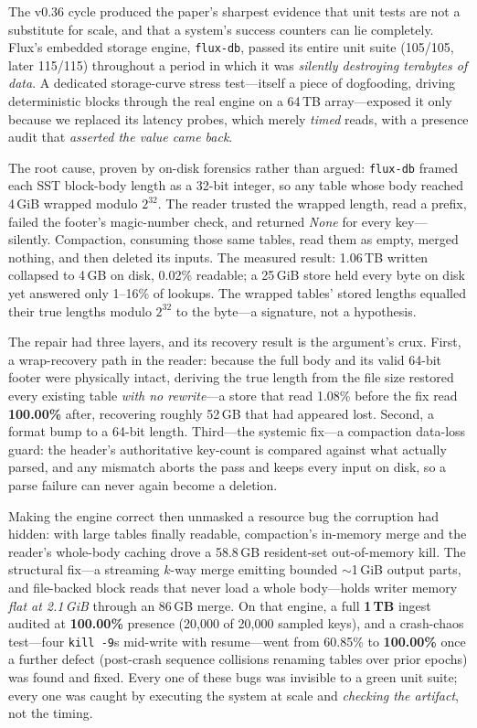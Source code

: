 The v0.36 cycle produced the paper's sharpest evidence that unit tests are not a substitute for scale, and that a system's success counters can lie completely. Flux's embedded storage engine, \texttt{flux-db}, passed its entire unit suite (105/105, later 115/115) throughout a period in which it was \emph{silently destroying terabytes of data}. A dedicated storage-curve stress test---itself a piece of dogfooding, driving deterministic blocks through the real engine on a 64\,TB array---exposed it only because we replaced its latency probes, which merely \emph{timed} reads, with a presence audit that \emph{asserted the value came back}.

The root cause, proven by on-disk forensics rather than argued: \texttt{flux-db} framed each SST block-body length as a 32-bit integer, so any table whose body reached 4\,GiB wrapped modulo $2^{32}$. The reader trusted the wrapped length, read a prefix, failed the footer's magic-number check, and returned \emph{None} for every key---silently. Compaction, consuming those same tables, read them as empty, merged nothing, and then deleted its inputs. The measured result: 1.06\,TB written collapsed to 4\,GB on disk, 0.02\% readable; a 25\,GiB store held every byte on disk yet answered only 1--16\% of lookups. The wrapped tables' stored lengths equalled their true lengths modulo $2^{32}$ to the byte---a signature, not a hypothesis.

The repair had three layers, and its recovery result is the argument's crux. First, a wrap-recovery path in the reader: because the full body and its valid 64-bit footer were physically intact, deriving the true length from the file size restored every existing table \emph{with no rewrite}---a store that read 1.08\% before the fix read \textbf{100.00\%} after, recovering roughly 52\,GB that had appeared lost. Second, a format bump to a 64-bit length. Third---the systemic fix---a compaction data-loss guard: the header's authoritative key-count is compared against what actually parsed, and any mismatch aborts the pass and keeps every input on disk, so a parse failure can never again become a deletion.

Making the engine correct then unmasked a resource bug the corruption had hidden: with large tables finally readable, compaction's in-memory merge and the reader's whole-body caching drove a 58.8\,GB resident-set out-of-memory kill. The structural fix---a streaming $k$-way merge emitting bounded $\sim$1\,GiB output parts, and file-backed block reads that never load a whole body---holds writer memory \emph{flat at 2.1\,GiB} through an 86\,GB merge. On that engine, a full \textbf{1\,TB} ingest audited at \textbf{100.00\%} presence (20{,}000 of 20{,}000 sampled keys), and a crash-chaos test---four \texttt{kill\,-9}s mid-write with resume---went from 60.85\% to \textbf{100.00\%} once a further defect (post-crash sequence collisions renaming tables over prior epochs) was found and fixed. Every one of these bugs was invisible to a green unit suite; every one was caught by executing the system at scale and \emph{checking the artifact}, not the timing.

